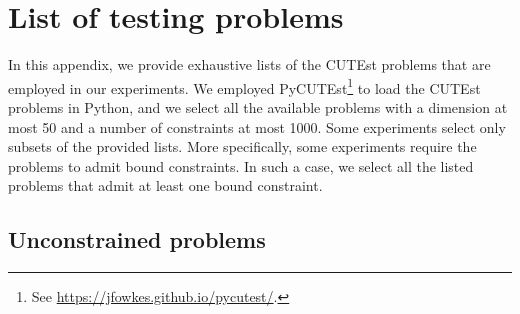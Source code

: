 %
%
%
\chapter{List of testing problems}

In this appendix, we provide exhaustive lists of the CUTEst problems that are employed in our experiments.
We employed PyCUTEst\footnote{See \url{https://jfowkes.github.io/pycutest/}.} to load the CUTEst problems in Python, and we select all the available problems with a dimension at most \num{50} and a number of constraints at most \num[group-minimum-digits=4]{1000}.
Some experiments select only subsets of the provided lists.
More specifically, some experiments require the problems to admit bound constraints.
In such a case, we select all the listed problems that admit at least one bound constraint.

\section{Unconstrained problems}
\label{sec:list-unconstrained-problems}

